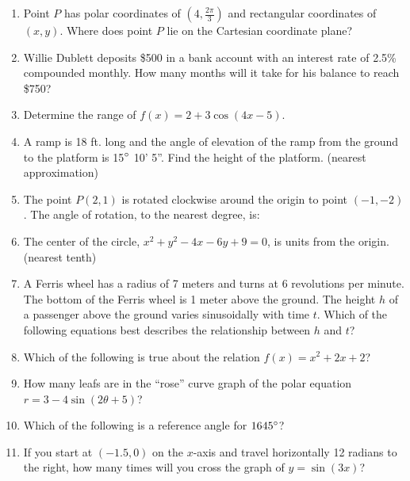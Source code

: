 \documentclass[../uilmath.tex]{subfiles}
\begin{document}
\begin{enumerate}[label=\bfseries\arabic*.]
    \item %
    Point $P$ has polar coordinates of $(4,\frac{2\pi}{3})$ and rectangular coordinates of $(x,y)$. Where does point $P$ lie on the Cartesian coordinate plane?

    \item %
    Willie Dublett deposits \$500 in a bank account with an interest rate of 2.5\% compounded monthly.
    How many months will it take for his balance to reach \$750?

    \item %
    Determine the range of $f(x)=2+3\cos(4x-5)$.

    \item %
    A ramp is 18 ft. long and the angle of elevation of the ramp from the ground to the platform 
    is 15$\degree$ 10' 5''. Find the height of the platform. (nearest approximation)

    \item %
    The point $P(2,1)$ is rotated clockwise around the origin to point $(-1,-2)$. The angle of rotation, to the nearest degree, is:

    \item %
    The center of the circle, $x^2+y^2-4x-6y+9=0$, is \blank units from the origin. (nearest tenth)

    \item %
    A Ferris wheel has a radius of 7 meters and turns at 6 revolutions per minute. The bottom of the Ferris wheel is 1 meter above the ground.
    The height $h$ of a passenger above the ground varies sinusoidally with time $t$. Which of the following equations best describes the relationship between $h$ and $t$?
    
    \item %
    Which of the following is true about the relation $f(x)=x^2+2x+2$?
    
    \item %
    How many leafs are in the ``rose'' curve graph of the polar equation $r=3-4\sin(2\theta+5)$?

    \item %
    Which of the following is a reference angle for $1645\degree$?

    \item %
    If you start at $(-1.5,0)$ on the $x$-axis and travel horizontally 12 radians to the right, how many times will you cross the graph of $y=\sin(3x)$?


\end{enumerate}
\end{document}
